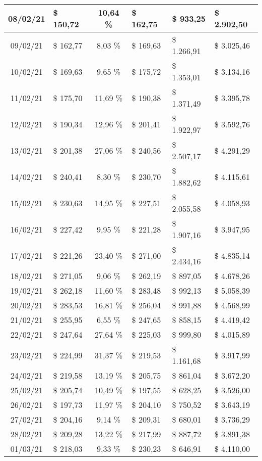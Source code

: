 \begin{center}
\begin{small}
\begin{longtable}{|c|l|c|l|l|l|}
08/02/21 & \$ 150,72 & 10,64 \% & \$ 162,75 & \$ 933,25 & \$ 2.902,50 \\ \hline
09/02/21 & \$ 162,77 & 8,03 \% & \$ 169,63 & \$ 1.266,91 & \$ 3.025,46 \\ \hline
10/02/21 & \$ 169,63 & 9,65 \% & \$ 175,72 & \$ 1.353,01 & \$ 3.134,16 \\ \hline
11/02/21 & \$ 175,70 & 11,69 \% & \$ 190,38 & \$ 1.371,49 & \$ 3.395,78 \\ \hline
12/02/21 & \$ 190,34 & 12,96 \% & \$ 201,41 & \$ 1.922,97 & \$ 3.592,76 \\ \hline
13/02/21 & \$ 201,38 & 27,06 \% & \$ 240,56 & \$ 2.507,17 & \$ 4.291,29 \\ \hline
14/02/21 & \$ 240,41 & 8,30 \% & \$ 230,70 & \$ 1.882,62 & \$ 4.115,61 \\ \hline
15/02/21 & \$ 230,63 & 14,95 \% & \$ 227,51 & \$ 2.055,58 & \$ 4.058,93 \\ \hline
16/02/21 & \$ 227,42 & 9,95 \% & \$ 221,28 & \$ 1.907,16 & \$ 3.947,95 \\ \hline
17/02/21 & \$ 221,26 & 23,40 \% & \$ 271,00 & \$ 2.434,16 & \$ 4.835,14 \\ \hline
18/02/21 & \$ 271,05 & 9,06 \% & \$ 262,19 & \$ 897,05 & \$ 4.678,26 \\ \hline
19/02/21 & \$ 262,18 & 11,60 \% & \$ 283,48 & \$ 992,13 & \$ 5.058,39 \\ \hline
20/02/21 & \$ 283,53 & 16,81 \% & \$ 256,04 & \$ 991,88 & \$ 4.568,99 \\ \hline
21/02/21 & \$ 255,95 & 6,55 \% & \$ 247,65 & \$ 858,15 & \$ 4.419,42 \\ \hline
22/02/21 & \$ 247,64 & 27,64 \% & \$ 225,03 & \$ 999,80 & \$ 4.015,89 \\ \hline
23/02/21 & \$ 224,99 & 31,37 \% & \$ 219,53 & \$ 1.161,68 & \$ 3.917,99 \\ \hline
24/02/21 & \$ 219,58 & 13,19 \% & \$ 205,75 & \$ 861,04 & \$ 3.672,20 \\ \hline
25/02/21 & \$ 205,74 & 10,49 \% & \$ 197,55 & \$ 628,25 & \$ 3.526,00 \\ \hline
26/02/21 & \$ 197,73 & 11,97 \% & \$ 204,10 & \$ 750,52 & \$ 3.643,19 \\ \hline
27/02/21 & \$ 204,16 & 9,14 \% & \$ 209,31 & \$ 680,01 & \$ 3.736,29 \\ \hline
28/02/21 & \$ 209,28 & 13,22 \% & \$ 217,99 & \$ 887,72 & \$ 3.891,38 \\ \hline
01/03/21 & \$ 218,03 & 9,33 \% & \$ 230,23 & \$ 646,91 & \$ 4.110,00 \\ \hline

\end{longtable}
\end{small}
\end{center}
